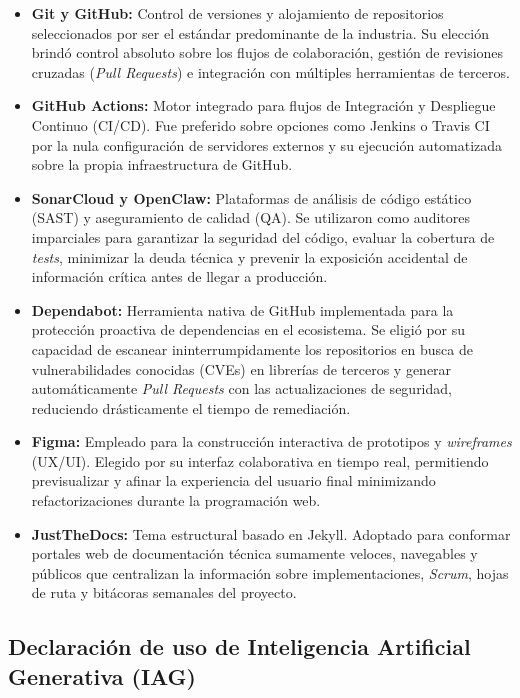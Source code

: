 \begin{itemize}
    \item \textbf{Git y GitHub:} Control de versiones y alojamiento de repositorios seleccionados por ser el estándar predominante de la industria. Su elección brindó control absoluto sobre los flujos de colaboración, gestión de revisiones cruzadas (\textit{Pull Requests}) e integración con múltiples herramientas de terceros.
    \item \textbf{GitHub Actions:} Motor integrado para flujos de Integración y Despliegue Continuo (CI/CD). Fue preferido sobre opciones como Jenkins o Travis CI por la nula configuración de servidores externos y su ejecución automatizada sobre la propia infraestructura de GitHub.
    \item \textbf{SonarCloud y OpenClaw:} Plataformas de análisis de código estático (SAST) y aseguramiento de calidad (QA). Se utilizaron como auditores imparciales para garantizar la seguridad del código, evaluar la cobertura de \textit{tests}, minimizar la deuda técnica y prevenir la exposición accidental de información crítica antes de llegar a producción.
    \item \textbf{Dependabot:} Herramienta nativa de GitHub implementada para la protección proactiva de dependencias en el ecosistema. Se eligió por su capacidad de escanear ininterrumpidamente los repositorios en busca de vulnerabilidades conocidas (CVEs) en librerías de terceros y generar automáticamente \textit{Pull Requests} con las actualizaciones de seguridad, reduciendo drásticamente el tiempo de remediación.
    \item \textbf{Figma:} Empleado para la construcción interactiva de prototipos y \textit{wireframes} (UX/UI). Elegido por su interfaz colaborativa en tiempo real, permitiendo previsualizar y afinar la experiencia del usuario final minimizando refactorizaciones durante la programación web.
    \item \textbf{JustTheDocs:} Tema estructural basado en Jekyll. Adoptado para conformar portales web de documentación técnica sumamente veloces, navegables y públicos que centralizan la información sobre implementaciones, \textit{Scrum}, hojas de ruta y bitácoras semanales del proyecto.
\end{itemize}

\newpage

\subsection{Declaración de uso de Inteligencia Artificial Generativa (IAG)}

